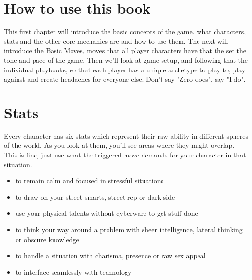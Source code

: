 \documentclass{tufte-book}
\begin{document}
\section{How to use this book} \label{sec: how to use this book}

This first chapter will introduce the basic concepts of the game, what characters, stats and the other core mechanics are and how to use them. The next will introduce the Basic Moves, moves that all player characters have that the set the tone and pace of the game. Then we'll look at game setup, and following that the individual playbooks, so that each player has a unique archetype to play to, play against and create headaches for everyone else. Don't say "Zero does", say "I do".

\section{Stats} \label{sec: Stats}
Every character has six stats which represent their raw ability in different spheres of the world. As you look at them, you'll see areas where they might overlap. This is fine, just use what the triggered move demands for your character in that situation.

\begin{itemize}
	\item {} to remain calm and focused in stressful situations
	\item {} to draw on your street smarts, street rep or dark side
	\item {} use your physical talents without cyberware to get stuff done
	\item {} to think your way around a problem with sheer intelligence, lateral thinking or obscure knowledge
	\item {} to handle a situation with charisma, presence or raw sex appeal
	\item {} to interface seamlessly with technology
\end{itemize}
\end{document}
